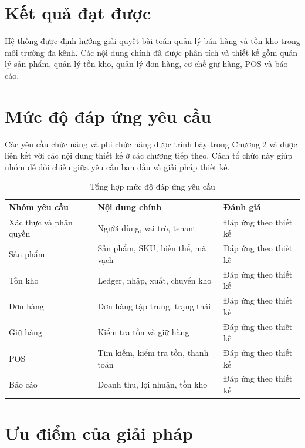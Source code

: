 \section{Kết quả đạt được}

Hệ thống được định hướng giải quyết bài toán quản lý bán hàng và tồn kho trong môi trường
đa kênh. Các nội dung chính đã được phân tích và thiết kế gồm quản lý sản phẩm,
quản lý tồn kho, quản lý đơn hàng, cơ chế giữ hàng, POS và báo cáo.

\section{Mức độ đáp ứng yêu cầu}

Các yêu cầu chức năng và phi chức năng được trình bày trong Chương 2 và được liên kết
với các nội dung thiết kế ở các chương tiếp theo. Cách tổ chức này giúp nhóm dễ đối chiếu
giữa yêu cầu ban đầu và giải pháp thiết kế.

\begin{table}[htbp]
    \centering
    \caption{Tổng hợp mức độ đáp ứng yêu cầu}
    \label{tab:evaluation-requirements}
    \begin{tabular}{|p{}|p{}|p{}|}
        \hline
        \textbf{Nhóm yêu cầu} & \textbf{Nội dung chính} & \textbf{Đánh giá} \\
        \hline
        Xác thực và phân quyền & Người dùng, vai trò, tenant & Đáp ứng theo thiết kế \\
        \hline
        Sản phẩm & Sản phẩm, SKU, biến thể, mã vạch & Đáp ứng theo thiết kế \\
        \hline
        Tồn kho & Ledger, nhập, xuất, chuyển kho & Đáp ứng theo thiết kế \\
        \hline
        Đơn hàng & Đơn hàng tập trung, trạng thái & Đáp ứng theo thiết kế \\
        \hline
        Giữ hàng & Kiểm tra tồn và giữ hàng & Đáp ứng theo thiết kế \\
        \hline
        POS & Tìm kiếm, kiểm tra tồn, thanh toán & Đáp ứng theo thiết kế \\
        \hline
        Báo cáo & Doanh thu, lợi nhuận, tồn kho & Đáp ứng theo thiết kế \\
        \hline
    \end{tabular}
\end{table}

\section{Ưu điểm của giải pháp}

